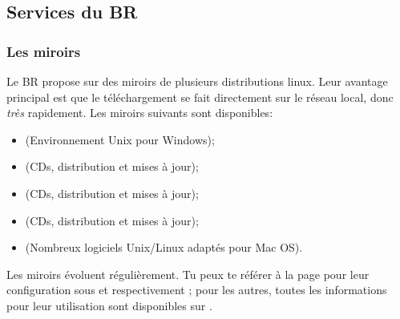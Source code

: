 \subsection{Services du BR}


\subsubsection{Les miroirs}
Le BR propose sur  des miroirs de plusieurs distributions linux. Leur avantage principal est que le téléchargement se fait directement sur le réseau local, donc \emph{très} rapidement.
Les miroirs suivants sont disponibles:

\begin{itemize}
\item {} (Environnement Unix pour Windows);
\item {} (CDs, distribution et mises à jour);
\item {} (CDs, distribution et mises à jour);
\item {} (CDs, distribution et mises à jour);
\item {} (Nombreux logiciels Unix/Linux adaptés pour Mac OS).
\end{itemize}



Les miroirs évoluent régulièrement. Tu peux te référer \`a la page \pageref{ubuntu_mirror} pour leur configuration sous  et  respectivement ; pour les autres, toutes les informations pour leur utilisation sont disponibles sur .
